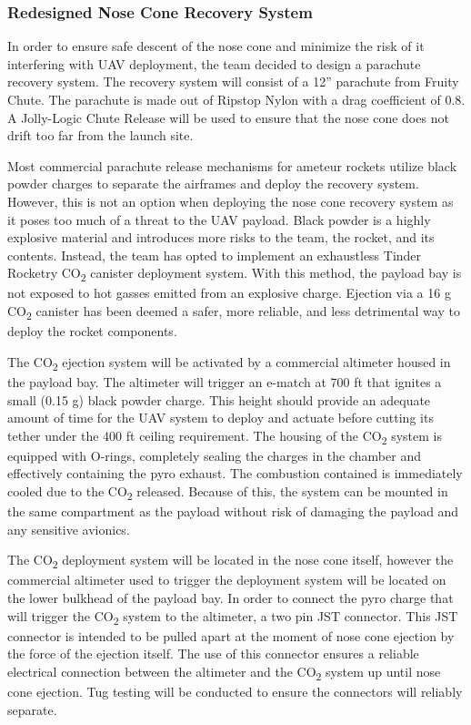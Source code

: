 		\subsubsection{Redesigned Nose Cone Recovery System}
        In order to ensure safe descent of the nose cone and minimize the risk of it interfering with UAV deployment, the team decided to design a parachute recovery system. The recovery system will consist of a 12” parachute from Fruity Chute. The parachute is made out of Ripstop Nylon with a drag coefficient of 0.8. A Jolly-Logic Chute Release will be used to ensure that the nose cone does not drift too far from the launch site.

        Most commercial parachute release mechanisms for ameteur rockets utilize black powder charges to separate the airframes and deploy the recovery system. However, this is not an option when deploying the nose cone recovery system as it poses too much of a threat to the UAV payload. Black powder is a highly explosive material and introduces more risks to the team, the rocket, and its contents. Instead, the team has opted to implement an exhaustless Tinder Rocketry CO\textsubscript{2} canister deployment system. With this method, the payload bay is not exposed to hot gasses emitted from an explosive charge. Ejection via a 16 g CO\textsubscript{2} canister has been deemed a safer, more reliable, and less detrimental way to deploy the rocket components. 
        
        The CO\textsubscript{2} ejection system will be activated by a commercial altimeter housed in the payload bay. The altimeter will trigger an e-match at 700 ft that ignites a small (0.15 g) black powder charge. This height should provide an adequate amount of time for the UAV system to deploy and actuate before cutting its tether under the 400 ft ceiling requirement. The housing of the CO\textsubscript{2} system is equipped with O-rings, completely sealing the charges in the chamber and effectively containing the pyro exhaust. The combustion contained is immediately cooled due to the CO\textsubscript{2} released. Because of this, the system can be mounted in the same compartment as the payload without risk of damaging the payload and any sensitive avionics. 
        
        The CO\textsubscript{2} deployment system will be located in the nose cone itself, however the commercial altimeter used to trigger the deployment system will be located on the lower bulkhead of the payload bay. In order to connect the pyro charge that will trigger the CO\textsubscript{2} system to the altimeter, a two pin JST connector. This JST connector is intended to be pulled apart at the moment of nose cone ejection by the force of the ejection itself. The use of this connector ensures a reliable electrical connection between the altimeter and the CO\textsubscript{2} system up until nose cone ejection. Tug testing will be conducted to ensure the connectors will reliably separate. 

